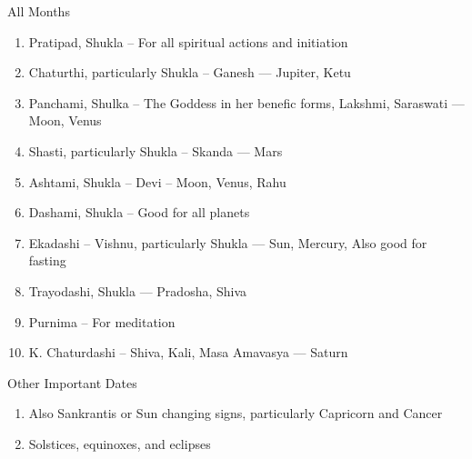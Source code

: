 
All Months
\begin{enumerate} 
\item[] Pratipad, Shukla – For all spiritual actions and initiation
\item[] Chaturthi, particularly Shukla – Ganesh — Jupiter, Ketu
\item[] Panchami, Shulka – The Goddess in her benefic forms, Lakshmi, Saraswati — Moon, Venus
\item[] Shasti, particularly Shukla – Skanda — Mars
\item[] Ashtami, Shukla – Devi – Moon, Venus, Rahu
\item[] Dashami, Shukla – Good for all planets
\item[] Ekadashi – Vishnu, particularly Shukla — Sun, Mercury, Also good for fasting
\item[] Trayodashi, Shukla — Pradosha, Shiva
\item[] Purnima – For meditation
\item[] K. Chaturdashi – Shiva, Kali, Masa Amavasya — Saturn
 \end{enumerate}

Other Important Dates
\begin{enumerate} 
\item[] Also Sankrantis or Sun changing signs, particularly Capricorn and Cancer
\item[] Solstices, equinoxes, and eclipses
\end{enumerate}